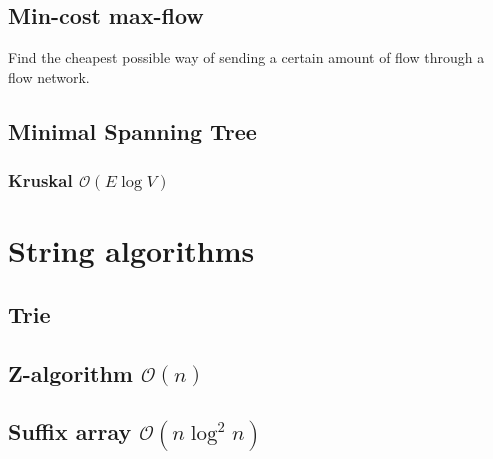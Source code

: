 \documentclass[8pt,a4paper,landscape,oneside]{amsart}
\begin{document}
\begin{multicols*}{3}


\subsection{Min-cost max-flow}

Find the cheapest possible way of sending a certain amount of flow through a flow network.



\subsection{Minimal Spanning Tree}

\begin{comment}
\subsubsection{Prim $\mathcal{O}((E + V) \log V)$}


\end{comment}

\subsubsection{Kruskal $\mathcal{O}(E \log V)$}

\begin{comment}

\end{comment}

\section{String algorithms}

\subsection{Trie}



\subsection{Z-algorithm $\mathcal{O}(n)$}



\subsection{Suffix array $\mathcal{O}(n \log^2{n})$}


\end{multicols*}
\end{document}
